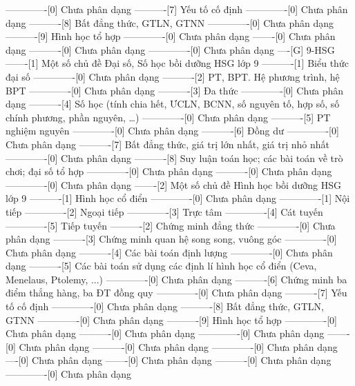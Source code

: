 -------------[0] Chưa phân dạng
----------[7] Yếu tố cố định
-------------[0] Chưa phân dạng
----------[8] Bất đẳng thức, GTLN, GTNN
-------------[0] Chưa phân dạng
----------[9] Hình học tổ hợp
-------------[0] Chưa phân dạng
-------[0] Chưa phân dạng
----------[0] Chưa phân dạng
-------------[0] Chưa phân dạng
----[G] 9-HSG
-------[1] Một số chủ đề Đại số, Số học bồi dưỡng HSG lớp 9
----------[1] Biểu thức đại số
-------------[0] Chưa phân dạng
----------[2] PT, BPT. Hệ phương trình, hệ BPT
-------------[0] Chưa phân dạng
----------[3] Đa thức
-------------[0] Chưa phân dạng
----------[4] Số học (tính chia hết, ƯCLN, BCNN, số nguyên tố, hợp số, số chính phương, phần nguyên, \ldots)
-------------[0] Chưa phân dạng
----------[5] PT nghiệm nguyên
-------------[0] Chưa phân dạng
----------[6] Đồng dư
-------------[0] Chưa phân dạng
----------[7] Bất đẳng thức, giá trị lớn nhất, giá trị nhỏ nhất
-------------[0] Chưa phân dạng
----------[8] Suy luận toán học; các bài toán về trò chơi; đại số tổ hợp
-------------[0] Chưa phân dạng
----------[0] Chưa phân dạng
-------------[0] Chưa phân dạng
-------[2] Một số chủ đề Hình học bồi dưỡng HSG lớp 9
----------[1] Hình học cổ điển
-------------[0] Chưa phân dạng
-------------[1] Nội tiếp
-------------[2] Ngoại tiếp
-------------[3] Trực tâm
-------------[4] Cát tuyến
-------------[5] Tiếp tuyến
----------[2] Chứng minh đẳng thức
-------------[0] Chưa phân dạng
----------[3] Chứng minh quan hệ song song, vuông góc
-------------[0] Chưa phân dạng
----------[4] Các bài toán định lượng
-------------[0] Chưa phân dạng
----------[5] Các bài toán sử dụng các định lí hình học cổ điển (Ceva, Menelaus, Ptolemy, ...)
-------------[0] Chưa phân dạng
----------[6] Chứng minh ba điểm thẳng hàng, ba ĐT đồng quy
-------------[0] Chưa phân dạng
----------[7] Yếu tố cố định
-------------[0] Chưa phân dạng
----------[8] Bất đẳng thức, GTLN, GTNN
-------------[0] Chưa phân dạng
----------[9] Hình học tổ hợp
-------------[0] Chưa phân dạng
----------[0] Chưa phân dạng
-------------[0] Chưa phân dạng
-------[0] Chưa phân dạng
----------[0] Chưa phân dạng
-------------[0] Chưa phân dạng
----[0] Chưa phân dạng
-------[0] Chưa phân dạng
----------[0] Chưa phân dạng
-------------[0] Chưa phân dạng
